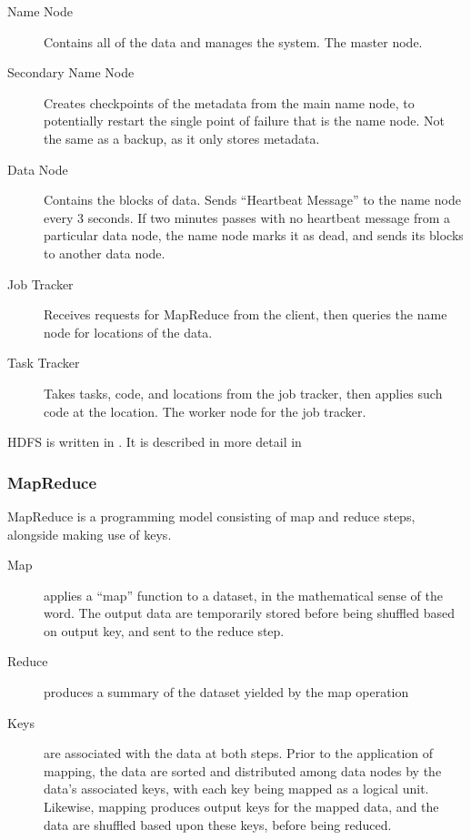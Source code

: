 \begin{description}

	\item[Name Node]
		Contains all of the data and manages the system.
		The master node.
	\item[Secondary Name Node]
		Creates checkpoints of the metadata from the main name node, to
		potentially restart the single point of failure that is the name node.
		Not the same as a backup, as it only stores metadata.
	\item[Data Node]
		Contains the blocks of data.
		Sends ``Heartbeat Message'' to the name node every 3 seconds.
		If two minutes passes with no heartbeat message from a particular data node, the name node marks it as dead, and sends its blocks to another data node.
	\item[Job Tracker]
		Receives requests for MapReduce from the client, then queries the name
		node for locations of the data.
	\item[Task Tracker]
		Takes tasks, code, and locations from the job tracker, then applies such
		code at the location.
		The worker node for the job tracker.
\end{description}

HDFS is written in .
It is described in more detail in \cite{shvachko2010hadoop}

\subsubsection{MapReduce}\label{sec:mapreduce}

MapReduce is a programming model consisting of map and reduce steps, alongside making use of keys.

\begin{description}

	\item[Map]
		applies a ``map'' function to a dataset, in the mathematical sense of
		the word.
		The output data are temporarily stored before being shuffled based on output key, and sent to the reduce step.
	\item[Reduce]
		produces a summary of the dataset yielded by the map operation
	\item[Keys]
		are associated with the data at both steps.
		Prior to the application of mapping, the data are sorted and distributed among data nodes by the data's associated keys, with each key being mapped as a logical unit.
		Likewise, mapping produces output keys for the mapped data, and the data are shuffled based upon these keys, before being reduced.
\end{description}

